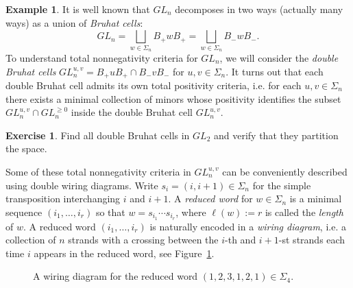 \documentclass{amsart}
\theoremstyle{definition}
\newtheorem{example}[theorem]{Example}
\newtheorem{subexercise}{Exercise}[theorem]
\theoremstyle{remark}
\numberwithin{equation}{section}
\begin{document}
\begin{example}
    It is well known that $GL_n$ decomposes in two ways (actually many ways) as a union of \emph{Bruhat cells}:
    \[GL_n=\bigsqcup_{w\in\Sigma_n}B_+w B_+=\bigsqcup_{w\in\Sigma_n}B_-w B_-.\]
    To understand total nonnegativity criteria for $GL_n$, we will consider the \emph{double Bruhat cells} $GL_n^{u,v}=B_+uB_+\cap B_-vB_-$ for $u,v\in\Sigma_n$.  It turns out that each double Bruhat cell admits its own total positivity criteria, i.e. for each $u,v\in\Sigma_n$ there exists a minimal collection of minors whose positivity identifies the subset $GL_n^{u,v}\cap GL_n^{\ge0}$ inside the double Bruhat cell $GL_n^{u,v}$.
    \begin{subexercise}
      Find all double Bruhat cells in $GL_2$ and verify that they partition the space.
    \end{subexercise}

    Some of these total nonnegativity criteria in $GL_n^{u,v}$ can be conveniently described using double wiring diagrams.  Write $s_i=(i,i+1)\in\Sigma_n$ for the simple transposition interchanging $i$ and $i+1$.  A \emph{reduced word} for $w\in\Sigma_n$ is a minimal sequence $(i_1,\ldots,i_r)$ so that $w=s_{i_1}\cdots s_{i_r}$, where $\ell(w):=r$ is called the \emph{length} of $w$.  A reduced word $(i_1,\ldots,i_r)$ is naturally encoded in a \emph{wiring diagram}, i.e. a collection of $n$ strands with a crossing between the $i$-th and $i+1$-st strands each time $i$ appears in the reduced word, see Figure~\ref{fig:wiring diagram}.
    \begin{figure}[h]
    \caption{A wiring diagram for the reduced word $(1,2,3,1,2,1)\in\Sigma_4$.}
    \label{fig:wiring diagram}
    \end{figure}


\end{example}
\end{document}
